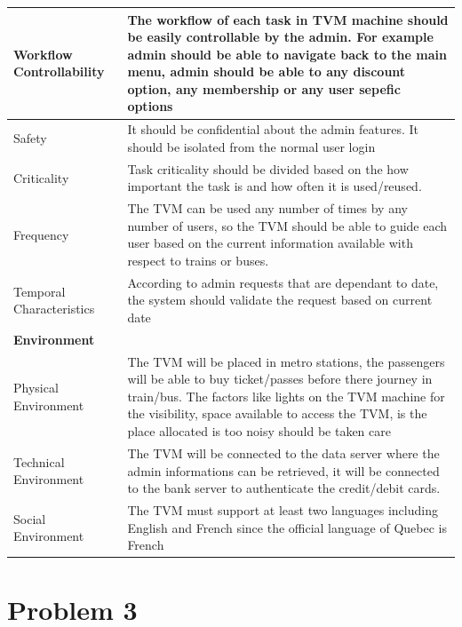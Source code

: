 \documentclass[a4paper,12pt]{report}
\begin{document}
\setlength{\tabcolsep}{18pt}
\renewcommand{\arraystretch}{1.5}
\begin{tabular}[H]{ |p{3cm}|p{12cm}| }
	\hline
	Workflow Controllability & 
	The workflow of each task in TVM machine should be easily controllable by the admin. For example admin should be able to navigate back to the main menu, admin should be able to any discount option, any membership or any user sepefic options\\
	\hline
	Safety & 
	It should be confidential about the admin features. It should be isolated from the normal user login\\
	\hline
	Criticality & 
	Task criticality should be divided based on the how important the task is and how often it is used/reused.\\
	\hline
	Frequency & 
	The TVM can be used any number of times by any number of users, so the TVM should be able to guide each user based on the current information available with respect to trains or buses.\\
	\hline
	Temporal Characteristics & 
	According to admin requests that are dependant to date, the system should validate the request based on current date \\
	\hline
	\textbf{Environment} & \\
	\hline
	Physical Environment & 
	The TVM will be placed in metro stations, the passengers will be able to buy ticket/passes before there journey in train/bus. The factors like lights on the TVM machine for the visibility, space available to access the TVM, is the place allocated is too noisy should be taken care \\
	\hline
	Technical Environment & 
	The TVM will be connected to the data server where the admin informations can be retrieved, it will be connected to the bank server to authenticate the credit/debit cards. \\
	\hline
	Social Environment & 
	The TVM must support at least two languages including English and French since the official language of Quebec is French \\
	\hline
\end{tabular}





%
%

\newpage


\section{Problem 3}
\end{document}

